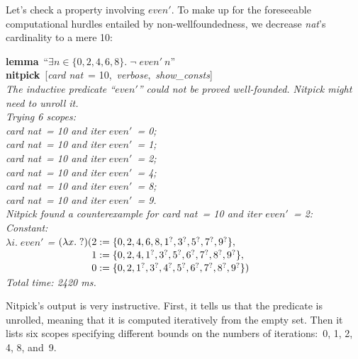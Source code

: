\documentclass[a4paper,12pt]{article}
\def\unk{{?}}
\def\undef{(\lambda x.\; \unk)}
\def\Q{{\smash{\lower.2ex\hbox{$\scriptstyle?$}}}}
\begin{document}
Let's check a property involving $\textit{even}'$. To make up for the
foreseeable computational hurdles entailed by non-wellfoundedness, we decrease
\textit{nat}'s cardinality to a mere 10:

\prew
\textbf{lemma}~``$\exists n \in \{0, 2, 4, 6, 8\}.\;
\lnot\;\textit{even}'~n$'' \\
\textbf{nitpick}~[\textit{card nat}~= 10,\, \textit{verbose},\, \textit{show\_consts}] \\[2\smallskipamount]
\slshape
The inductive predicate ``$\textit{even}'\!$'' could not be proved well-founded.
Nitpick might need to unroll it. \\[2\smallskipamount]
Trying 6 scopes: \\
\hbox{}\qquad \textit{card nat}~= 10 and \textit{iter} $\textit{even}'$~= 0; \\
\hbox{}\qquad \textit{card nat}~= 10 and \textit{iter} $\textit{even}'$~= 1; \\
\hbox{}\qquad \textit{card nat}~= 10 and \textit{iter} $\textit{even}'$~= 2; \\
\hbox{}\qquad \textit{card nat}~= 10 and \textit{iter} $\textit{even}'$~= 4; \\
\hbox{}\qquad \textit{card nat}~= 10 and \textit{iter} $\textit{even}'$~= 8; \\
\hbox{}\qquad \textit{card nat}~= 10 and \textit{iter} $\textit{even}'$~= 9. \\[2\smallskipamount]
Nitpick found a counterexample for \textit{card nat}~= 10 and \textit{iter} $\textit{even}'$~= 2: \\[2\smallskipamount]
\hbox{}\qquad Constant: \nopagebreak \\
\hbox{}\qquad\qquad $\lambda i.\; \textit{even}'$ = $\undef(\!\begin{aligned}[t]
& 2 := \{0, 2, 4, 6, 8, 1^\Q, 3^\Q, 5^\Q, 7^\Q, 9^\Q\}, \\[-2pt]
& 1 := \{0, 2, 4, 1^\Q, 3^\Q, 5^\Q, 6^\Q, 7^\Q, 8^\Q, 9^\Q\}, \\[-2pt]
& 0 := \{0, 2, 1^\Q, 3^\Q, 4^\Q, 5^\Q, 6^\Q, 7^\Q, 8^\Q, 9^\Q\})\end{aligned}$ \\[2\smallskipamount]
Total time: 2420 ms.
\postw

Nitpick's output is very instructive. First, it tells us that the predicate is
unrolled, meaning that it is computed iteratively from the empty set. Then it
lists six scopes specifying different bounds on the numbers of iterations:\ 0,
1, 2, 4, 8, and~9.
\end{document}
